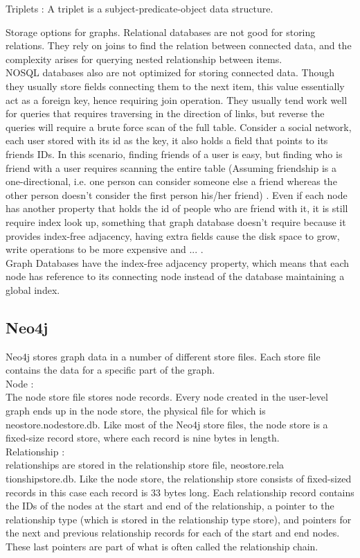 \documentclass[english]{tktltiki}
\begin{document}
Triplets : 
A triplet is a subject-predicate-object data structure. 

Storage options for graphs.
Relational databases are not good for storing relations. They rely on joins to find the relation between connected data, and the complexity arises for 
querying nested relationship between items. \\
NOSQL databases also are not optimized for storing connected data. Though they usually store fields connecting them to the next item, this value essentially act as a foreign key, hence requiring join operation. They usually tend work well for queries that requires traversing in the direction of links, but reverse the queries will require a brute force scan of the full table. Consider a social network, each user stored with its id as the key, it also holds a field that points to its friends IDs. In this scenario, finding friends of a user is easy, but finding who is friend with a user requires scanning the entire table (Assuming friendship is a one-directional, i.e. one person can consider someone else a friend whereas the other person doesn't consider the first person his/her friend) . Even if each node has another property that holds the id of people who are friend with it, it is still require index look up, something that graph database doesn't require because it provides index-free adjacency, having extra fields cause the disk space to grow, write operations to be more expensive and ... .\\
Graph Databases have the index-free adjacency property, which means that each node has reference to its connecting node instead of the database maintaining a global index.

\subsection{Neo4j }
Neo4j stores graph data in a number of different store files. Each store file contains the data for a specific part of the graph.\\
Node :\\
The node store file stores node records. Every node created in the user-level graph ends up in the node store, the physical file for which is neostore.nodestore.db. Like most of the Neo4j store files, the node store is a fixed-size record store, where each record is nine bytes in length. \\
Relationship :\\
relationships are stored in the relationship store file, neostore.rela tionshipstore.db. Like the node store, the relationship store consists of fixed-sized records in this case each record is 33 bytes long. Each relationship record contains the IDs of the nodes at the start and end of the relationship, a pointer to the relationship type (which is stored in the relationship type store), and pointers for the next and previous relationship records for each of the start and end nodes. These last pointers are part of what is often called the relationship chain.
\end{document}
